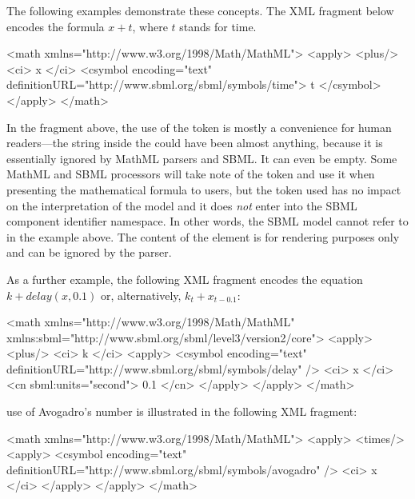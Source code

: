 The following examples demonstrate these concepts.  The XML fragment below
encodes the formula $x + t$, where $t$ stands for time.

\begin{example}
<math xmlns="http://www.w3.org/1998/Math/MathML">
    <apply>
        <plus/>
        <ci> x </ci>
        <csymbol encoding="text" definitionURL="http://www.sbml.org/sbml/symbols/time">
            t
        </csymbol>
    </apply>
</math>
\end{example}


In the fragment above, the use of the token  is mostly a
convenience for human readers---the string inside the
 could have been almost anything, because it is
essentially ignored by MathML parsers and SBML.  It can
  even be empty.  Some MathML and SBML processors will take note
of the token and use it when presenting the mathematical formula
to users, but the token used has no impact on the interpretation
of the model and it does \emph{not} enter into the SBML component
identifier namespace.  In other words, the SBML model cannot refer
to  in the example above.  The content of the
 element is for rendering purposes only and can be
ignored by the parser.

As a further example, the following XML fragment encodes the equation
$k + delay(x, 0.1)$ or, alternatively, $k_t + x_{t - 0.1}$:

\begin{example}
<math xmlns="http://www.w3.org/1998/Math/MathML"
      xmlns:sbml="http://www.sbml.org/sbml/level3/version2/core">
    <apply>
        <plus/>
        <ci> k </ci>
        <apply>
            <csymbol encoding="text" definitionURL="http://www.sbml.org/sbml/symbols/delay" />
            <ci> x </ci>
            <cn sbml:units="second"> 0.1 </cn>
        </apply>
    </apply>
</math>
\end{example}

 use of Avogadro's number is illustrated in the
following XML fragment:

\begin{example}
<math xmlns="http://www.w3.org/1998/Math/MathML">
    <apply>
        <times/>
        <apply>
            <csymbol encoding="text" definitionURL="http://www.sbml.org/sbml/symbols/avogadro" />
            <ci> x </ci>
        </apply>
    </apply>
</math>
\end{example}

